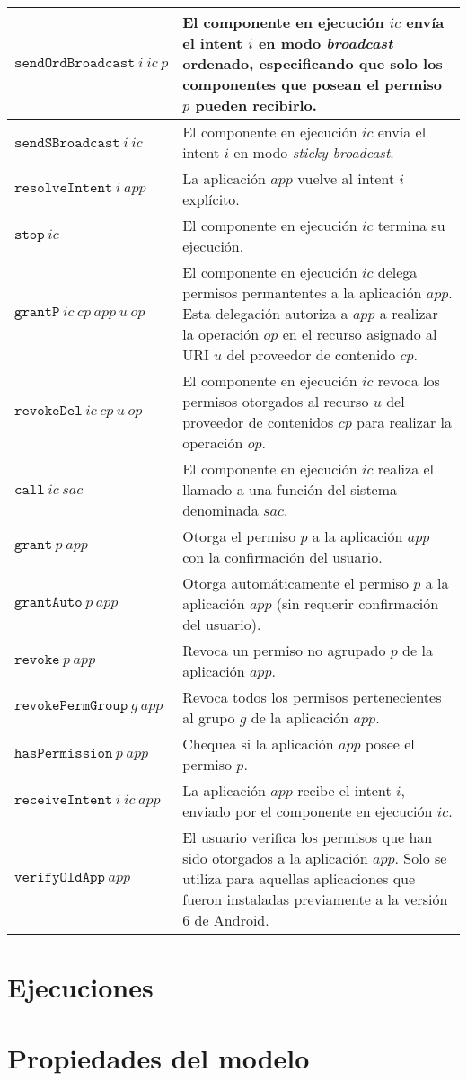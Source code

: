 \begin{table}
\begin{tabularx}{\linewidth}{|l X|}
	$\mathtt{sendOrdBroadcast}~i~ic~p$	& El componente en ejecución $ic$ envía el intent $i$ en modo \textit{broadcast} ordenado,  especificando que solo los componentes que posean el permiso $p$ pueden recibirlo. \\
	\hline
	$\mathtt{sendSBroadcast}~i~ic$	& El componente en ejecución $ic$ envía el intent $i$ en modo \textit{sticky broadcast}. \\
	\hline
	$\mathtt{resolveIntent}~i~app$	& La aplicación $app$ vuelve al intent $i$ explícito. \\
	\hline
	$\mathtt{stop}~ic$	& El componente en ejecución $ic$ termina su ejecución. \\
	\hline
	$\mathtt{grantP}~ic~cp~app~u~op$	& El componente en ejecución $ic$ delega permisos permantentes a la aplicación $app$. Esta delegación autoriza a $app$ a realizar la operación $op$ en el recurso asignado al URI $u$ del proveedor de contenido $cp$. \\
	\hline
	$\mathtt{revokeDel}~ic~cp~u~op$	& El componente en ejecución $ic$ revoca los permisos otorgados al recurso $u$ del proveedor de contenidos $cp$ para realizar la operación $op$. \\
	\hline
	$\mathtt{call}~ic~sac$	& El componente en ejecución $ic$ realiza el llamado a una función del sistema denominada $sac$. \\
	\hline
	$\mathtt{grant}~p~app$	& Otorga el permiso $p$ a la aplicación $app$ con la confirmación del usuario. \\
	\hline
	$\mathtt{grantAuto}~p~app$	& Otorga automáticamente el permiso $p$ a la aplicación $app$ (sin requerir confirmación del usuario). \\
	\hline
	$\mathtt{revoke}~p~app$	& Revoca un permiso no agrupado $p$ de la aplicación $app$. \\
	\hline
	$\mathtt{revokePermGroup}~g~app$	& Revoca todos los permisos pertenecientes al grupo $g$ de la aplicación $app$. \\
	\hline
	$\mathtt{hasPermission}~p~app$	& Chequea si la aplicación $app$ posee el permiso $p$. \\
	\hline
	$\mathtt{receiveIntent}~i~ic~app$	& La aplicación $app$ recibe el intent $i$, enviado por el componente en ejecución $ic$. \\
	\hline
	$\mathtt{verifyOldApp}~app$	& El usuario verifica los permisos que han sido otorgados a la aplicación $app$. Solo se utiliza para aquellas aplicaciones que fueron instaladas previamente a la versión 6 de Android.   \\
	\hline
  \end{tabularx}
\end{table}

\section{Ejecuciones}

\section{Propiedades del modelo}